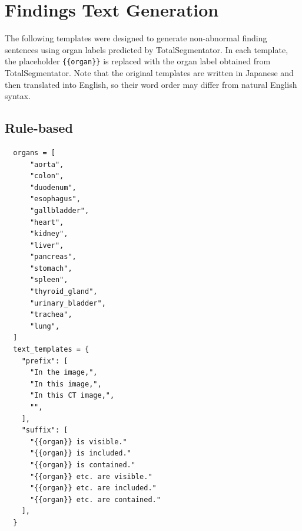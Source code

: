 \documentclass[bioengineering,article,submit,pdftex,moreauthors]{Definitions/mdpi}
\begin{document}




\appendixstart
\appendix
\section{Findings Text Generation}\label{app:rule_based_text_prompt}
The following templates were designed to generate non-abnormal finding sentences using organ labels predicted by TotalSegmentator. 
In each template, the placeholder \texttt{\{\{organ\}\}} is replaced with the organ label obtained from TotalSegmentator. 
Note that the original templates are written in Japanese and then translated into English, so their word order may differ from natural English syntax.
\subsection{Rule-based}
\begin{verbatim}
  organs = [
      "aorta",
      "colon",
      "duodenum",
      "esophagus",
      "gallbladder",
      "heart",
      "kidney",
      "liver",
      "pancreas",
      "stomach",
      "spleen",
      "thyroid_gland",
      "urinary_bladder",
      "trachea",
      "lung",
  ]
  text_templates = {
    "prefix": [
      "In the image,",
      "In this image,",
      "In this CT image,",
      "",
    ],
    "suffix": [
      "{{organ}} is visible."
      "{{organ}} is included."
      "{{organ}} is contained."
      "{{organ}} etc. are visible."
      "{{organ}} etc. are included."
      "{{organ}} etc. are contained."
    ],
  }
\end{verbatim}
\end{document}
